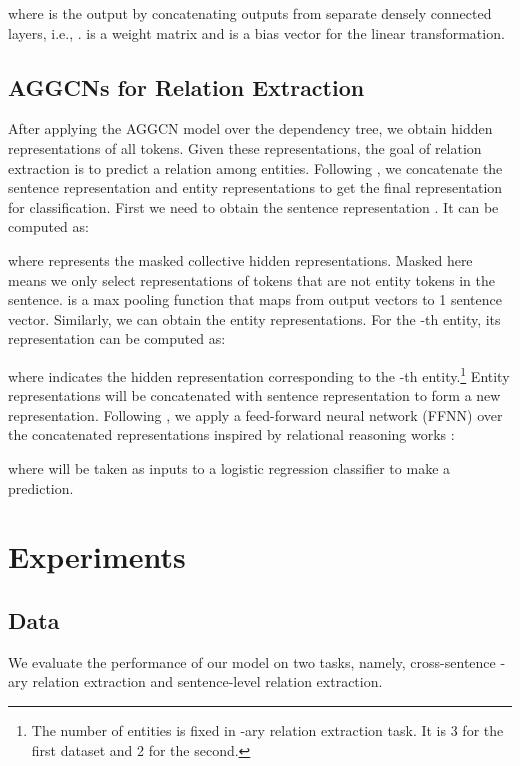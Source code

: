 \documentclass[11pt,a4paper]{article}
\begin{document}
where  is the output by concatenating outputs from  separate densely connected layers, i.e., .  is a weight matrix and  is a bias vector for the linear transformation.  


\subsection{AGGCNs for Relation Extraction}
\label{ssec:2.5}

After applying the AGGCN model over the dependency tree, we obtain hidden representations of all tokens. Given these representations, the goal of relation extraction is to predict a relation among entities. Following \citep{Zhang2018GraphCO}, we concatenate the sentence representation and entity representations to get the final representation for classification. First we need to obtain the sentence representation . It can be computed as:

where  represents the masked collective hidden representations. 
Masked here means we only select representations
of tokens that are not entity tokens in the sentence.  is a max pooling function that maps from  output vectors to 1 sentence vector. Similarly, we can obtain the entity representations. For the -th entity, its representation  can be computed as:

where  indicates the hidden representation corresponding to the -th entity.\footnote{The number of entities is fixed in -ary relation extraction task. It is 3 for the first dataset and 2 for the second.} Entity representations will be concatenated with sentence representation to form a new representation. Following \citep{Zhang2018GraphCO}, we apply a feed-forward neural network (FFNN) over the concatenated representations inspired by relational reasoning works \citep{Santoro2017ASN, Lee2017EndtoendNC}:

where  will be taken as inputs to a logistic regression classifier to make a prediction.

\section{Experiments}



\subsection{Data}
We evaluate the performance of our model on two tasks, namely,  cross-sentence -ary relation extraction and sentence-level relation extraction. 
\end{document}
